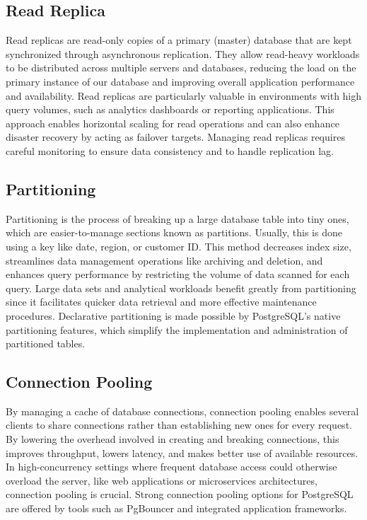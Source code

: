 \documentclass[conference]{IEEEtran}
\begin{document}
\subsection{Read Replica\cite{b19}\cite{b20}}
Read replicas are read-only copies of a primary (master) database that are kept synchronized through asynchronous replication. They allow read-heavy workloads to be distributed across multiple servers and databases, reducing the load on the primary instance of our database and improving overall application performance and availability. Read replicas are particularly valuable in environments with high query volumes, such as analytics dashboards or reporting applications. This approach enables horizontal scaling for read operations and can also enhance disaster recovery by acting as failover targets. Managing read replicas requires careful monitoring to ensure data consistency and to handle replication lag.

\subsection{Partitioning\cite{b22}}
Partitioning is the process of breaking up a large database table into tiny ones, which are easier-to-manage sections known as partitions. Usually, this is done using a key like date, region, or customer ID. This method decreases index size, streamlines data management operations like archiving and deletion, and enhances query performance by restricting the volume of data scanned for each query. Large data sets and analytical workloads benefit greatly from partitioning since it facilitates quicker data retrieval and more effective maintenance procedures. Declarative partitioning is made possible by PostgreSQL's native partitioning features, which simplify the implementation and administration of partitioned tables. 

\subsection{Connection Pooling\cite{b13}}
By managing a cache of database connections, connection pooling enables several clients to share connections rather than establishing new ones for every request. By lowering the overhead involved in creating and breaking connections, this improves throughput, lowers latency, and makes better use of available resources. In high-concurrency settings where frequent database access could otherwise overload the server, like web applications or microservices architectures, connection pooling is crucial. Strong connection pooling options for PostgreSQL are offered by tools such as PgBouncer and integrated application frameworks. 
\end{document}

